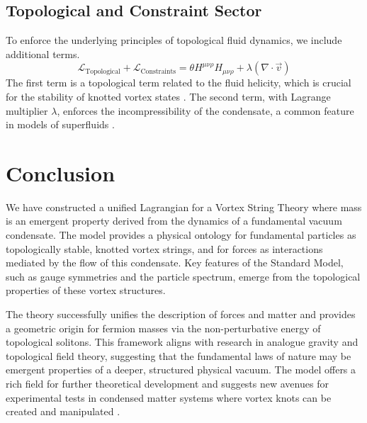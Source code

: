 \documentclass[a4paper,12pt]{article}
\begin{document}
    \subsection{Topological and Constraint Sector}
    To enforce the underlying principles of topological fluid dynamics, we include additional terms.
    \begin{equation}
        \mathcal{L}_{\text{Topological}} + \mathcal{L}_{\text{Constraints}} = \theta H^{\mu\nu\rho} H_{\mu\nu\rho} + \lambda(\nabla \cdot \vec{v})
    \end{equation}
    The first term is a topological term related to the fluid helicity, which is crucial for the stability of knotted vortex states \cite{Moffatt1969, Arnold1998}. The second term, with Lagrange multiplier $\lambda$, enforces the incompressibility of the condensate, a common feature in models of superfluids \cite{Volovik2003}.

    \section{Conclusion}

    We have constructed a unified Lagrangian for a Vortex String Theory where mass is an emergent property derived from the dynamics of a fundamental vacuum condensate. The model provides a physical ontology for fundamental particles as topologically stable, knotted vortex strings, and for forces as interactions mediated by the flow of this condensate. Key features of the Standard Model, such as gauge symmetries and the particle spectrum, emerge from the topological properties of these vortex structures.

    The theory successfully unifies the description of forces and matter and provides a geometric origin for fermion masses via the non-perturbative energy of topological solitons. This framework aligns with research in analogue gravity \cite{Barcelo2011} and topological field theory, suggesting that the fundamental laws of nature may be emergent properties of a deeper, structured physical vacuum. The model offers a rich field for further theoretical development and suggests new avenues for experimental tests in condensed matter systems where vortex knots can be created and manipulated \cite{Kleckner2013}.

    \newpage
    \printbibliography[title={References}]
\end{document}
